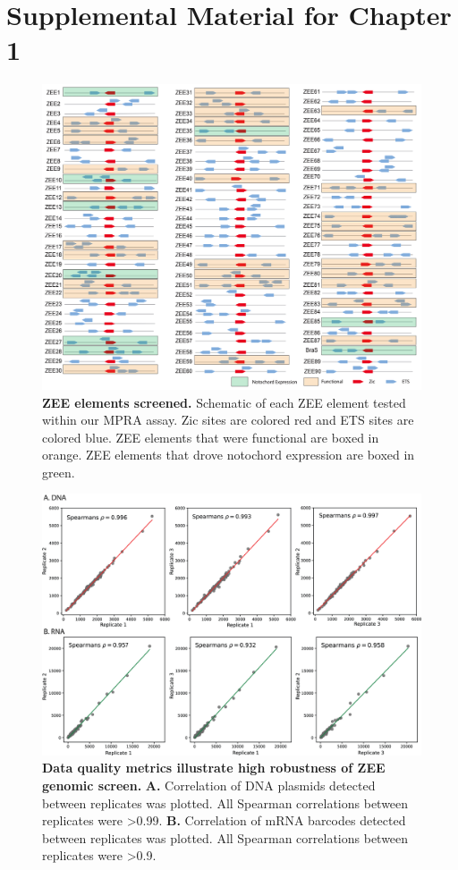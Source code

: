 \chapter{Supplemental Material for Chapter 1}

\begin{figure}[h]
    \centering
    \includegraphics[scale=.25]{2_figures/FigS1_ZEE-Library.png}
    \caption[ZEE elements screened]{\textbf{ZEE elements screened.} Schematic of each ZEE element tested within our MPRA assay. Zic sites are colored red and ETS sites are colored blue. ZEE elements that were functional are boxed in orange. ZEE elements that drove notochord expression are boxed in green.}
\end{figure}

\begin{figure}[p]
    \centering
    \includegraphics[scale=.75]{2_figures/FigS2_Data-QC.png}
    \caption[Data quality metrics illustrate high robustness of ZEE genomic screen]{\textbf{Data quality metrics illustrate high robustness of ZEE genomic screen.} \textbf{A.} Correlation of DNA plasmids detected between replicates was plotted. All Spearman correlations between replicates were >0.99. \textbf{B.} Correlation of mRNA barcodes detected between replicates was plotted. All Spearman correlations between replicates were >0.9.}
\end{figure}

